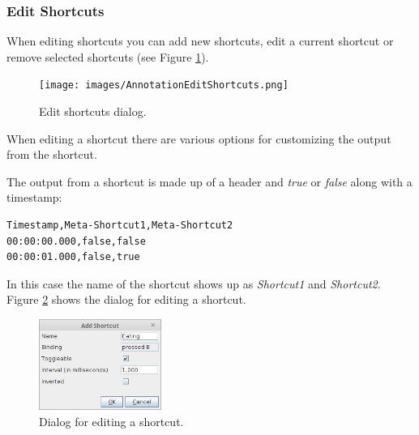 \documentclass[a4paper]{book}
\begin{document}
\subsubsection{Edit Shortcuts}
When editing shortcuts you can add new shortcuts, edit a current shortcut or
remove selected shortcuts (see Figure \ref{AnnotationEditShortcuts}).

\begin{figure}[htb]
  \centering
  \texttt{[image: images/AnnotationEditShortcuts.png]}
  \caption{Edit shortcuts dialog.}
  \label{AnnotationEditShortcuts}
\end{figure}

When editing a shortcut there are various options for customizing the output
from the shortcut.

The output from a shortcut is made up of a header and \textit{true} or
\textit{false} along with a timestamp:

\begin{verbatim}
Timestamp,Meta-Shortcut1,Meta-Shortcut2
00:00:00.000,false,false
00:00:01.000,false,true
\end{verbatim}

In this case the name of the shortcut shows up as \textit{Shortcut1} and
\textit{Shortcut2}. Figure \ref{AnnotatorAddShortcut} shows the dialog for editing a
shortcut.

\begin{figure}[htb]
  \centering
  \includegraphics[width=4.0cm]{images/AnnotatorAddShortcut.png}
  \caption{Dialog for editing a shortcut.}
  \label{AnnotatorAddShortcut}
\end{figure}
\end{document}
